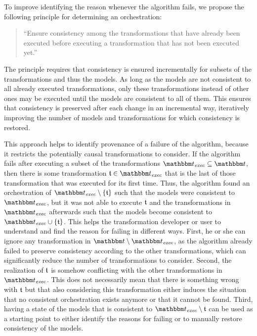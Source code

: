 To improve identifying the reason whenever the algorithm fails, we propose the following principle for determining an orchestration:
{
\setlength{\leftmargini}{2em}
\begin{quote}
    \enquote{Ensure consistency among the transformations that have already been executed before executing a transformation that has not been executed yet.}~
\end{quote}
}
The principle requires that consistency is ensured incrementally for subsets of the transformations and thus the models.
As long as the models are not consistent to all already executed transformations, only these transformations instead of other ones may be executed until the models are consistent to all of them.
This ensures that consistency is preserved after each change in an incremental way, iteratively improving the number of models and transformations for which consistency is restored.

This approach helps to identify provenance of a failure of the algorithm, because it restricts the potentially causal transformations to consider.
If the algorithm fails after executing a subset of the transformations $\transformationset{T}_\mathvariable{exec} \subseteq \transformationset{T}$,
then there is some transformation $\transformation{t} \in \transformationset{T}_\mathvariable{exec}$ that is the last of those transformation that was executed for its first time.
Thus, the algorithm found an orchestration of $\transformationset{T}_\mathvariable{exec} \setminus \setted{\transformation{t}}$ such that the models were consistent to $\transformationset{T}_\mathvariable{exec}$, but it was not able to execute $\transformation{t}$ and the transformations in $\transformationset{T}_\mathvariable{exec}$ afterwards such that the models become consistent to  $\transformationset{T}_\mathvariable{exec} \cup \setted{\transformation{t}}$.
This helps the transformation developer or user to understand and find the reason for failing in different ways.
First, he or she can ignore any transformation in $\transformationset{T} \setminus \transformationset{T}_\mathvariable{exec}$, as the algorithm already failed to preserve consistency according to the other transformations, which can significantly reduce the number of transformations to consider.
Second, the realization of $\transformation{t}$ is somehow conflicting with the other transformations in $\transformationset{T}_\mathvariable{exec}$. This does not necessarily mean that there is something wrong with $\transformation{t}$ but that also considering this transformation either induces the situation that no consistent orchestration exists anymore or that it cannot be found.
Third, having a state of the models that is consistent to $\transformationset{T}_\mathvariable{exec} \setminus \transformation{t}$ can be used as a starting point to either identify the reasons for failing or to manually restore consistency of the models.

